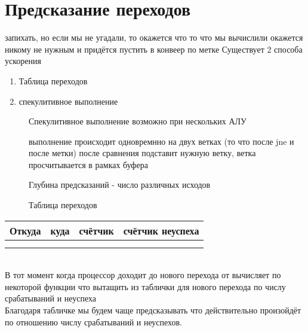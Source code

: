 \documentclass[a4paper, 12pt]{article}
\begin{document}
\section*{Предсказание переходов}
\hypertarget{predict_jmps}{}
запихать, но если мы не угадали, то окажется что то что мы вычислили окажется никому не нужным и придётся пустить в конвеер по метке
Существует 2 способа ускорения
\begin{enumerate}
    \item Таблица переходов
    \item спекулитивное выполнение
\end{enumerate}
\begin{description}
    \item[] Спекулитивное выполнение возможно при нескольких АЛУ
    \item[] выполнение происходит одновремнно на двух ветках (то что после jne и после метки) после сравнения подставит нужную ветку, ветка просчитывается в рамках буфера
    \item[] Глубина предсказаний -  число различных исходов
\end{description}
\begin{description}
    \item[]Таблица переходов
\end{description}
\begin{tabular}{|c|c|c|c|}
    \hline
    Откуда & куда & счётчик & счётчик неуспеха \\ 
    \hline
    & & & \\
    \hline
    & & & \\
    \hline
\end{tabular} \\
В тот момент когда процессор доходит до нового перехода от вычисляет по некоторой функции что вытащить из таблички для нового перехода по числу срабатываний и неуспеха \\
Благодаря табличке мы будем чаще предсказывать что действительно произойдёт по отношению числу срабатываний и неуспехов.
\newpage
\end{document}
